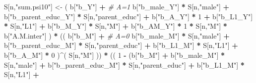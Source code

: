 \documentclass[
]{book}
\newenvironment{Shaded}{\begin{snugshade}}{\end{snugshade}}
\newcommand{\CommentTok}[1]{\textcolor[rgb]{0.56,0.35,0.01}{\textit{#1}}}
\newcommand{\DecValTok}[1]{\textcolor[rgb]{0.00,0.00,0.81}{#1}}
\newcommand{\NormalTok}[1]{#1}
\newcommand{\OtherTok}[1]{\textcolor[rgb]{0.56,0.35,0.01}{#1}}
\newcommand{\SpecialCharTok}[1]{\textcolor[rgb]{0.81,0.36,0.00}{\textbf{#1}}}
\newcommand{\StringTok}[1]{\textcolor[rgb]{0.31,0.60,0.02}{#1}}
\begin{document}
\begin{Shaded}
\begin{Highlighting}[]
\NormalTok{    S[n,}\StringTok{"sum.psi10"}\NormalTok{] }\OtherTok{\textless{}{-}}\NormalTok{  ( b[}\StringTok{"b\_Y"}\NormalTok{] }\SpecialCharTok{+}                                           \CommentTok{\# A=1}
\NormalTok{                             b[}\StringTok{"b\_male\_Y"}\NormalTok{] }\SpecialCharTok{*}\NormalTok{ S[n,}\StringTok{"male"}\NormalTok{] }\SpecialCharTok{+} 
\NormalTok{                             b[}\StringTok{"b\_parent\_educ\_Y"}\NormalTok{] }\SpecialCharTok{*}\NormalTok{ S[n,}\StringTok{"parent\_educ"}\NormalTok{] }\SpecialCharTok{+} 
\NormalTok{                             b[}\StringTok{"b\_A\_Y"}\NormalTok{] }\SpecialCharTok{*} \DecValTok{1} \SpecialCharTok{+} 
\NormalTok{                             b[}\StringTok{"b\_L1\_Y"}\NormalTok{] }\SpecialCharTok{*}\NormalTok{ S[n,}\StringTok{"L1"}\NormalTok{] }\SpecialCharTok{+}
\NormalTok{                             b[}\StringTok{"b\_M\_Y"}\NormalTok{] }\SpecialCharTok{*}\NormalTok{ S[n,}\StringTok{"M"}\NormalTok{] }\SpecialCharTok{+}
\NormalTok{                             b[}\StringTok{"b\_AM\_Y"}\NormalTok{] }\SpecialCharTok{*} \DecValTok{1} \SpecialCharTok{*}\NormalTok{ S[n,}\StringTok{"M"}\NormalTok{] }\SpecialCharTok{*}\NormalTok{ b[}\StringTok{"A.M.inter"}\NormalTok{] ) }\SpecialCharTok{*}
\NormalTok{      (( b[}\StringTok{"b\_M"}\NormalTok{] }\SpecialCharTok{+}                                                             \CommentTok{\# A\textquotesingle{}=0}
\NormalTok{           b[}\StringTok{"b\_male\_M"}\NormalTok{] }\SpecialCharTok{*}\NormalTok{ S[n,}\StringTok{"male"}\NormalTok{] }\SpecialCharTok{+} 
\NormalTok{           b[}\StringTok{"b\_parent\_educ\_M"}\NormalTok{] }\SpecialCharTok{*}\NormalTok{ S[n,}\StringTok{"parent\_educ"}\NormalTok{] }\SpecialCharTok{+} 
\NormalTok{           b[}\StringTok{"b\_L1\_M"}\NormalTok{] }\SpecialCharTok{*}\NormalTok{ S[n,}\StringTok{"L1"}\NormalTok{] }\SpecialCharTok{+}
\NormalTok{           b[}\StringTok{"b\_A\_M"}\NormalTok{] }\SpecialCharTok{*} \DecValTok{0}\NormalTok{ )}\SpecialCharTok{\^{}}\NormalTok{( S[n,}\StringTok{"M"}\NormalTok{] )) }\SpecialCharTok{*}
\NormalTok{      (( }\DecValTok{1} \SpecialCharTok{{-}}\NormalTok{ (b[}\StringTok{"b\_M"}\NormalTok{] }\SpecialCharTok{+} 
\NormalTok{                b[}\StringTok{"b\_male\_M"}\NormalTok{] }\SpecialCharTok{*}\NormalTok{ S[n,}\StringTok{"male"}\NormalTok{] }\SpecialCharTok{+} 
\NormalTok{                b[}\StringTok{"b\_parent\_educ\_M"}\NormalTok{] }\SpecialCharTok{*}\NormalTok{ S[n,}\StringTok{"parent\_educ"}\NormalTok{] }\SpecialCharTok{+} 
\NormalTok{                b[}\StringTok{"b\_L1\_M"}\NormalTok{] }\SpecialCharTok{*}\NormalTok{ S[n,}\StringTok{"L1"}\NormalTok{] }\SpecialCharTok{+}

\end{Highlighting}
\end{Shaded}
\end{document}
